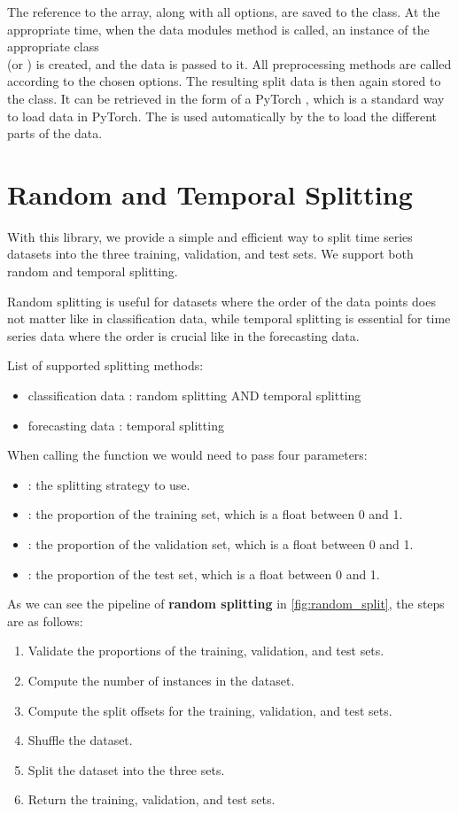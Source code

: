 \documentclass[review]{AIM_report}
\begin{document}
The reference to the \numpy array, along with all options, are saved to the class. At the appropriate time, when the data modules \setup method is called, an instance of the appropriate class\\
(\forecastingDataSet or \classificationDataSet) is created, and the data is passed to it. All preprocessing methods are called according to the chosen options. The resulting split data is then again stored to the \rustDM class. It can be retrieved in the form of a PyTorch \dataLoader, which is a standard way to load data in PyTorch. The \dataLoader is used automatically by the \lightningModule to load the different parts of the data.

\newpage
\section{Random and Temporal Splitting}
With this library, we provide a simple and efficient way to split time series datasets into the three training, validation, and test sets. We support both random and temporal splitting.

Random splitting is useful for datasets where the order of the data points does not matter like in classification data, while temporal splitting is essential for time series data where the order is crucial like in the forecasting data.

List of supported splitting methods:
\begin{itemize}
    \item classification data : random splitting AND temporal splitting
    \item forecasting data : temporal splitting
\end{itemize}

When calling the function \splitShort we would need to pass four parameters:
\begin{itemize}
    \item \splitStrategy: the splitting strategy to use.
    \item \trainProp: the proportion of the training set, which is a float between 0 and 1.
    \item \valProp: the proportion of the validation set, which is a float between 0 and 1.
    \item \testProp: the proportion of the test set, which is a float between 0 and 1.
\end{itemize}

As we can see the pipeline of \textbf{random splitting} in \autoref{fig:random_split}, the steps are as follows:
\begin{enumerate}
    \item Validate the proportions of the training, validation, and test sets.
    \item Compute the number of instances in the dataset.
    \item Compute the split offsets for the training, validation, and test sets.
    \item Shuffle the dataset.
    \item Split the dataset into the three sets.
    \item Return the training, validation, and test sets.
\end{enumerate}
\end{document}
